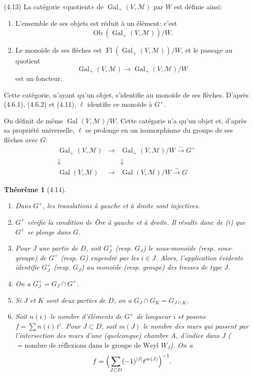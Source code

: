 \documentclass[12pt]{article}
\newtheorem{theoreme}{Théorème}
\theoremstyle{remark}
\DeclareMathOperator{\Gal}{Gal}
\DeclareMathOperator{\Ob}{Ob}
\DeclareMathOperator{\Fl}{Fl}
\begin{document}
(4.13) La catégorie «quotient» de $\Gal_+(V, \mathcal{M})$ par $W$ est définie ainsi:
\begin{enumerate}
\item[a)] L'ensemble de ses objets est réduit à un élément: c'est
\[\Ob(\Gal_+(V, \mathcal{M}))/W.\]
\item[b)] Le monoïde de ses flèches est $\Fl(\Gal_+(V, \mathcal{M}))/W$, et le passage au quotient
\[\Gal_+(V, \mathcal{M}) \to \Gal_+(V, \mathcal{M})/W\]
est un foncteur.
\end{enumerate}

Cette catégorie, n'ayant qu'un objet, s'identifie au monoïde de ses flèches. D'après (4.6.1), (4.6.2) et (4.11), $\ell$ identifie ce monoïde à $G^+$.

On définit de même $\Gal(V, \mathcal{M})/W$. Cette catégorie n'a qu'un objet et, d'après sa propriété universelle, $\ell$ se prolonge en un isomorphisme du groupe de ses flèches avec $G$:
\[\begin{array}{ccc}
\Gal_+(V, \mathcal{M}) & \longrightarrow & \Gal_+(V, \mathcal{M})/W \xrightarrow{\sim} G^+ \\
\downarrow & & \downarrow \\
\Gal(V, \mathcal{M}) & \longrightarrow & \Gal(V, \mathcal{M})/W \xrightarrow{\sim} G
\end{array}\]

\begin{theoreme}[4.14]
\begin{enumerate}
\item[(i)] Dans $G^+$, les translations à gauche et à droite sont injectives.
\item[(ii)] $G^+$ vérifie la condition de Öre à gauche et à droite. Il résulte donc de (i) que $G^+$ se plonge dans $G$.
\item[(iii)] Pour $J$ une partie de $D$, soit $G_J^+$ (resp. $G_J$) le sous-monoïde (resp. sous-groupe) de $G^+$ (resp. $G$) engendré par les $i \in J$. Alors, l'application évidente identifie $G_J^+$ (resp. $G_J$) au monoïde (resp. groupe) des tresses de type $J$.
\item[(iv)] On a $G_J^+ = G_J \cap G^+$.
\item[(v)] Si $J$ et $K$ sont deux parties de $D$, on a $G_J \cap G_K = G_{J \cap K}$.
\item[(vi)] Soit $n(i)$ le nombre d'éléments de $G^+$ de longueur $i$ et posons $f = \sum n(i) \, t^i$. Pour $J \subset D$, soit $m(J)$ le nombre des murs qui passent par l'intersection des murs d'une (quelconque) chambre $A$, d'indice dans $J$ ($= \text{nombre de réflexions dans le groupe de Weyl } W_J$). On a
\[f = \Bigl(\sum_{J \subset D} (-1)^{|J|} t^{m(J)}\Bigr)^{-1}.\]
\end{enumerate}
\end{theoreme}
\end{document}
